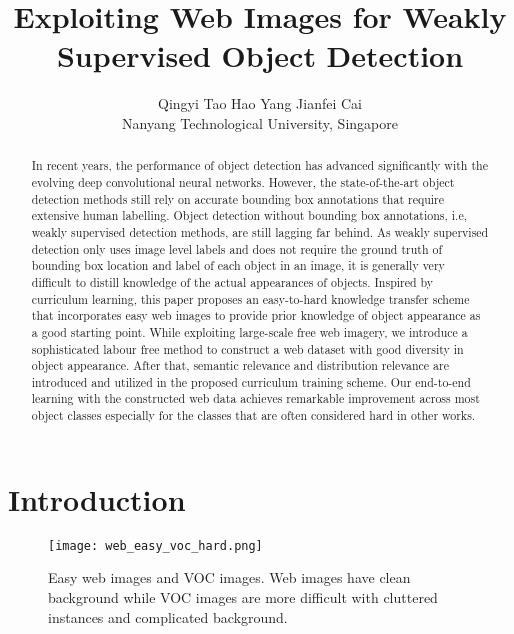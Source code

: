\documentclass[10pt,twocolumn,letterpaper]{article}
\begin{document}
\title{Exploiting Web Images for Weakly Supervised Object Detection}

\author{Qingyi Tao\qquad
Hao Yang
\qquad Jianfei Cai\\
Nanyang Technological University, Singapore
}
\date{}








\maketitle



\begin{abstract}
In recent years, the performance of object detection has advanced significantly with the evolving deep convolutional neural networks. However, the state-of-the-art object detection methods still rely on accurate bounding box annotations that require extensive human labelling. Object detection without bounding box annotations, i.e, weakly supervised detection methods, are still lagging far behind. As weakly supervised detection only uses image level labels and does not require the ground truth of bounding box location and label of each object in an image, it is generally very difficult to distill knowledge of the actual appearances of objects. Inspired by curriculum learning, this paper proposes an easy-to-hard knowledge transfer scheme that incorporates easy web images to provide prior knowledge of object appearance as a good starting point. While exploiting large-scale free web imagery, we introduce a sophisticated labour free method to construct a web dataset with good diversity in object appearance. After that, semantic relevance and distribution relevance are introduced and utilized in the proposed curriculum training scheme. Our end-to-end learning with the constructed web data achieves remarkable improvement across most object classes especially for the classes that are often considered hard in other works.
\end{abstract}

\section{Introduction}
\begin{figure}[t]
\texttt{[image: web\_easy\_voc\_hard.png]}
\caption{Easy web images and VOC images. Web images have clean background while VOC images are more difficult with cluttered instances and complicated background. }
\label{fig:web_easy_voc_hard}
\end{figure}
\end{document}
